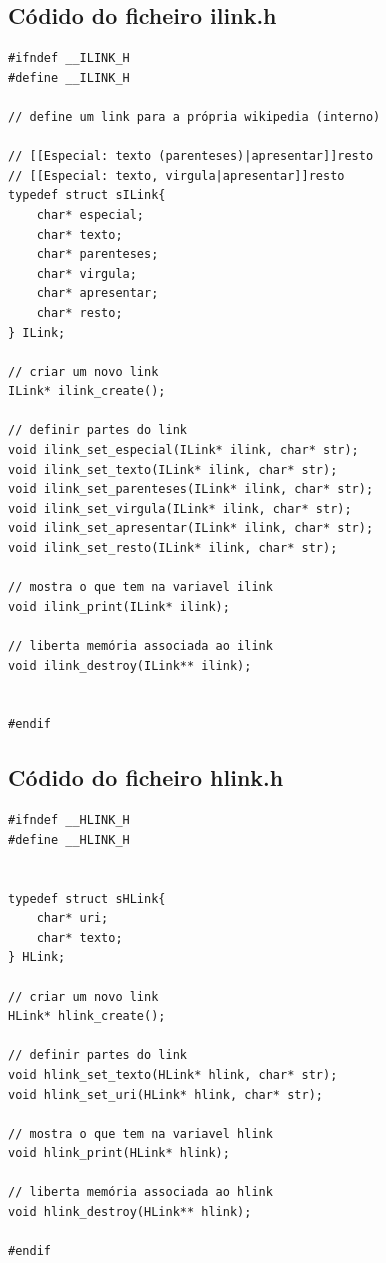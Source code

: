 \documentclass[11pt, a4paper, oneside]{article}
\begin{document}
\subsection{Códido do ficheiro ilink.h}
\begin{verbatim}
#ifndef __ILINK_H
#define __ILINK_H

// define um link para a própria wikipedia (interno)

// [[Especial: texto (parenteses)|apresentar]]resto
// [[Especial: texto, virgula|apresentar]]resto
typedef struct sILink{
    char* especial;
    char* texto;
    char* parenteses;
    char* virgula;
    char* apresentar;
    char* resto;
} ILink;

// criar um novo link
ILink* ilink_create();

// definir partes do link
void ilink_set_especial(ILink* ilink, char* str);
void ilink_set_texto(ILink* ilink, char* str);
void ilink_set_parenteses(ILink* ilink, char* str);
void ilink_set_virgula(ILink* ilink, char* str);
void ilink_set_apresentar(ILink* ilink, char* str);
void ilink_set_resto(ILink* ilink, char* str);

// mostra o que tem na variavel ilink
void ilink_print(ILink* ilink);

// liberta memória associada ao ilink
void ilink_destroy(ILink** ilink);


#endif
\end{verbatim}

\newpage
\subsection{Códido do ficheiro hlink.h}
\begin{verbatim}
#ifndef __HLINK_H
#define __HLINK_H


typedef struct sHLink{
    char* uri;
    char* texto;
} HLink;

// criar um novo link
HLink* hlink_create();

// definir partes do link
void hlink_set_texto(HLink* hlink, char* str);
void hlink_set_uri(HLink* hlink, char* str);

// mostra o que tem na variavel hlink
void hlink_print(HLink* hlink);

// liberta memória associada ao hlink
void hlink_destroy(HLink** hlink);

#endif



\end{verbatim}
\end{document}
